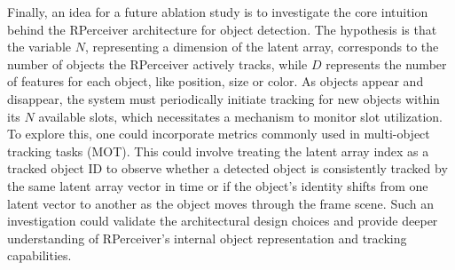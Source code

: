Finally, an idea for a future ablation study is to investigate the core intuition behind the RPerceiver architecture for object detection. The hypothesis is that the variable $N$, representing a dimension of the latent array, corresponds to the number of objects the RPerceiver actively tracks, while $D$ represents the number of features for each object, like position, size or color. As objects appear and disappear, the system must periodically initiate tracking for new objects within its $N$ available slots, which necessitates a mechanism to monitor slot utilization. To explore this, one could incorporate metrics commonly used in multi-object tracking tasks (MOT). This could involve treating the latent array index as a tracked object ID to observe whether a detected object is consistently tracked by the same latent array vector in time or if the object's identity shifts from one latent vector to another as the object moves through the frame scene. Such an investigation could validate the architectural design choices and provide deeper understanding of RPerceiver's internal object representation and tracking capabilities.

